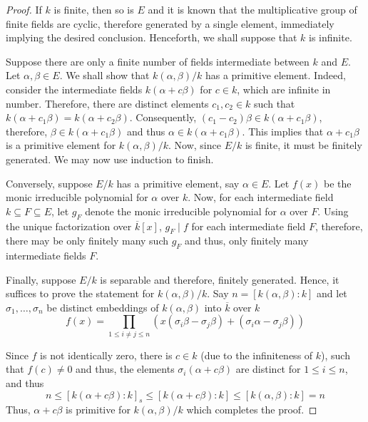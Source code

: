 \begin{proof}
    If $k$ is finite, then so is $E$ and it is known that the multiplicative group of finite fields are cyclic, therefore generated by a single element, immediately implying the desired conclusion. Henceforth, we shall suppose that $k$ is infinite.

    Suppose there are only a finite number of fields intermediate between $k$ and $E$. Let $\alpha,\beta\in E$. We shall show that $k(\alpha,\beta)/k$ has a primitive element. Indeed, consider the intermediate fields $k(\alpha + c\beta)$ for $c\in k$, which are infinite in number. Therefore, there are distinct elements $c_1,c_2\in k$ such that $k(\alpha + c_1\beta) = k(\alpha + c_2\beta)$. Consequently, $(c_1 - c_2)\beta\in k(\alpha + c_1\beta)$, therefore, $\beta\in k(\alpha + c_1\beta)$ and thus $\alpha\in k(\alpha + c_1\beta)$. This implies that $\alpha + c_1\beta$ is a primitive element for $k(\alpha,\beta)/k$. Now, since $E/k$ is finite, it must be finitely generated. We may now use induction to finish.

    Conversely, suppose $E/k$ has a primitive element, say $\alpha\in E$. Let $f(x)$ be the monic irreducible polynomial for $\alpha$ over $k$. Now, for each intermediate field $k\subseteq F\subseteq E$, let $g_F$ denote the monic irreducible polynomial for $\alpha$ over $F$. Using the unique factorization over $\overline{k}[x]$, $g_F\mid f$ for each intermediate field $F$, therefore, there may be only finitely many such $g_F$ and thus, only finitely many intermediate fields $F$.

    Finally, suppose $E/k$ is separable and therefore, finitely generated. Hence, it suffices to prove the statement for $k(\alpha, \beta)/k$. Say $n = [k(\alpha, \beta): k]$ and let $\sigma_1,\ldots,\sigma_n$ be distinct embeddings of $k(\alpha,\beta)$ into $\overline{k}$ over $k$
    \begin{equation*}
        f(x) = \prod_{1\le i\ne j\le n}\left(x(\sigma_i\beta - \sigma_j\beta) + (\sigma_i\alpha - \sigma_j\beta)\right)
    \end{equation*}

    Since $f$ is not identically zero, there is $c\in k$ (due to the infiniteness of $k$), such that $f(c)\ne 0$ and thus, the elements $\sigma_i(\alpha + c\beta)$ are distinct for $1\le i\le n$, and thus
    \begin{equation*}
        n\le[k(\alpha + c\beta): k]_s\le [k(\alpha + c\beta): k]\le[k(\alpha,\beta): k] = n
    \end{equation*}
    Thus, $\alpha + c\beta$ is primitive for $k(\alpha,\beta)/k$ which completes the proof.
\end{proof}

